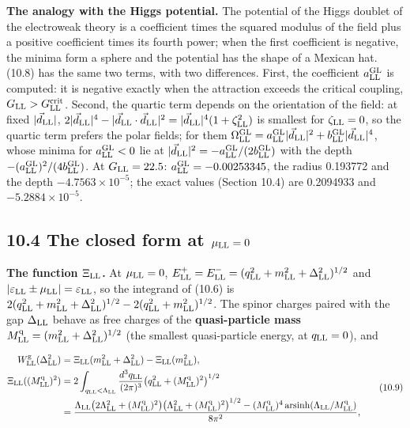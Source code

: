 \documentclass[
  10pt,
]{article}
\begin{document}
\textbf{The analogy with the Higgs potential.} The potential of the
Higgs doublet of the electroweak theory is a coefficient times the
squared modulus of the field plus a positive coefficient times its
fourth power; when the first coefficient is negative, the minima form a
sphere and the potential has the shape of a Mexican hat. (10.8) has the
same two terms, with two differences. First, the coefficient
\(a^{\rm GL}_{\rm LL}\) is computed: it is negative exactly when the
attraction exceeds the critical coupling,
\(G_{\rm LL}>G^{\rm crit}_{\rm LL}\). Second, the quartic term depends
on the orientation of the field: at fixed
\(\lvert\vec d_{\rm LL}\rvert\),
\(2\lvert\vec d_{\rm LL}\rvert^4-\lvert\vec d_{\rm LL}\cdot\vec d_{\rm LL}\rvert^2=\lvert\vec d_{\rm LL}\rvert^4(1+\zeta_{\rm LL}^2)\)
is smallest for \(\zeta_{\rm LL}=0\), so the quartic term prefers the
polar fields; for them
\(\Omega^{\rm GL}_{\rm LL}=a^{\rm GL}_{\rm LL}\lvert\vec d_{\rm LL}\rvert^2+b^{\rm GL}_{\rm LL}\lvert\vec d_{\rm LL}\rvert^4\),
whose minima for \(a^{\rm GL}_{\rm LL}<0\) lie at
\(\lvert\vec d_{\rm LL}\rvert^2=-a^{\rm GL}_{\rm LL}/(2b^{\rm GL}_{\rm LL})\)
with the depth \(-(a^{\rm GL}_{\rm LL})^2/(4b^{\rm GL}_{\rm LL})\). At
\(G_{\rm LL}=22.5\): \(a^{\rm GL}_{\rm LL}=-0.00253345\), the radius
0.193772 and the depth \(-4.7563\times10^{-5}\); the exact values
(Section 10.4) are 0.2094933 and \(-5.2884\times10^{-5}\).

\hypertarget{the-closed-form-at-mu_rm-ll0}{%
\subsection{\texorpdfstring{10.4 The closed form at
\(\mu_{\rm LL}=0\)}{10.4 The closed form at \textbackslash mu\_\{\textbackslash rm LL\}=0}}\label{the-closed-form-at-mu_rm-ll0}}

\textbf{The function \(\Xi_{\rm LL}\).} At \(\mu_{\rm LL}=0\),
\(E^+_{\rm LL}=E^-_{\rm LL}=(q_{\rm LL}^2+m_{\rm LL}^2+\Delta_{\rm LL}^2)^{1/2}\)
and
\(\lvert\varepsilon_{\rm LL}\pm\mu_{\rm LL}\rvert=\varepsilon_{\rm LL}\),
so the integrand of (10.6) is
\(2(q_{\rm LL}^2+m_{\rm LL}^2+\Delta_{\rm LL}^2)^{1/2}-2(q_{\rm LL}^2+m_{\rm LL}^2)^{1/2}\).
The spinor charges paired with the gap \(\Delta_{\rm LL}\) behave as
free charges of the \textbf{quasi-particle mass}
\(M^{\rm q}_{\rm LL}=(m_{\rm LL}^2+\Delta_{\rm LL}^2)^{1/2}\) (the
smallest quasi-particle energy, at \(q_{\rm LL}=0\)), and

\[\begin{aligned}W^{\rm g}_{\rm LL}(\Delta_{\rm LL}^2)&=\Xi_{\rm LL}(m_{\rm LL}^2+\Delta_{\rm LL}^2)-\Xi_{\rm LL}(m_{\rm LL}^2),\\\Xi_{\rm LL}((M^{\rm q}_{\rm LL})^2)&=2\int_{q_{\rm LL}<\Lambda_{\rm LL}}\frac{d^3q_{\rm LL}}{(2\pi)^3}\big(q_{\rm LL}^2+(M^{\rm q}_{\rm LL})^2\big)^{1/2}\\&=\frac{\Lambda_{\rm LL}\big(2\Lambda_{\rm LL}^2+(M^{\rm q}_{\rm LL})^2\big)\big(\Lambda_{\rm LL}^2+(M^{\rm q}_{\rm LL})^2\big)^{1/2}-(M^{\rm q}_{\rm LL})^4\,\mathrm{arsinh}(\Lambda_{\rm LL}/M^{\rm q}_{\rm LL})}{8\pi^2},\end{aligned}\tag{10.9}\]
\end{document}
